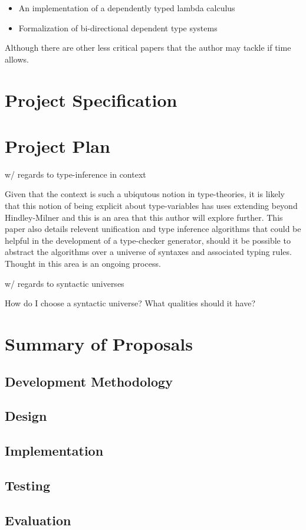 \documentclass{ProgressReport}[2020/09/15]
\begin{document}
          \begin{itemize}
          \item An implementation of a dependently typed lambda
            calculus \cite{ATutorialImplementationOfDTLC}
          \item Formalization of bi-directional dependent type systems \cite{TypesWhoSayNi}
          \end{itemize}

          Although there are other less critical papers that the
          author may tackle if time allows.

          
        
        \chapter{Project Specification}
        \chapter{Project Plan}

          w/ regards to type-inference in context
        
          Given that the context is such a ubiqutous notion in
          type-theories, it is likely that this notion of being
          explicit about type-variables has uses extending beyond
          Hindley-Milner and this is an area that this author will explore
          further. This paper also details relevent unification and type
          inference algorithms that could be helpful in the
          development of a type-checker generator, should it be
          possible to abstract the algorithms over a universe of
          syntaxes and associated typing rules. Thought in this area
          is an ongoing process.

          w/ regards to syntactic universes

          How do I choose a syntactic universe? What qualities should
          it have?

        \chapter{Summary of Proposals}
        \section{Development Methodology}
        \section{Design}
        \section{Implementation}
        \section{Testing}
        \section{Evaluation}
	
	
	
	\clearpage
	\printbibliography
	\nocite{*} %
\end{document}

